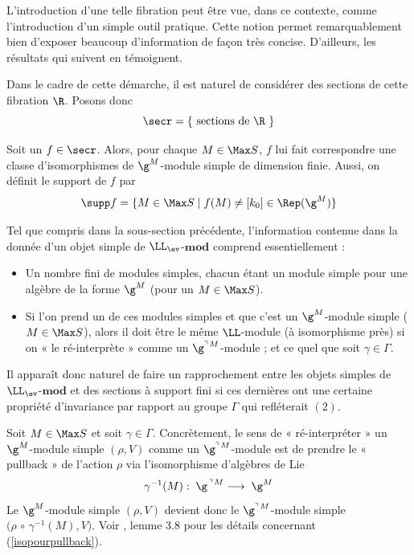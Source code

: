 \begin{Rem} L'introduction d'une telle fibration peut être vue, dans ce contexte, comme l'introduction d'un simple outil pratique. Cette notion permet remarquablement bien d'exposer beaucoup d'information de façon très concise. D'ailleurs, les résultats qui suivent en témoignent.
\end{Rem}

Dans le cadre de cette démarche, il est naturel de considérer des sections de cette fibration $\R$. Posons donc 
$$ \secr = \{ \text{ sections de } \R \text{ } \} $$

Soit un $f \in \secr$. Alors, pour chaque $M \in \Max S$, $f$ lui fait correspondre une classe d'isomorphismes de $\g^M$-module simple de dimension finie. Aussi, on définit le support de $f$ par
$$ \supp f  = \{M \in \Max S \; | \; f(M) \neq [k_0] \in \Rep(\g^M)\}$$

\begin{Rem} \label{supraremarque} Tel que compris dans la sous-section précédente, l'information contenue dans la donnée d'un objet simple de $\LL_{\ev}$-$\mathbf{mod}$ comprend essentiellement :
\begin{itemize}
\item[\em(1)] Un nombre fini de modules simples, chacun étant un module simple pour une algèbre de la forme $\g^M$ (pour un $M \in \Max S$).
\item[\em(2)] Si l'on prend un de ces modules simples et que c'est un $\g^M$-module simple ($M \in \Max S$), alors il doit être le même $\LL$-module (à isomorphisme près) si on « le ré-interprète » comme un $\g^{{}^\gamma M}$-module ; et ce quel que soit $\gamma \in \Gamma$.
\end{itemize}
Il apparaît donc naturel de faire un rapprochement entre les objets simples de $\LL_{\ev}$-$\mathbf{mod}$ et des sections à support fini si ces dernières ont une certaine propriété d'invariance par rapport au groupe $\Gamma$ qui refléterait $(2)$.
\end{Rem}

Soit $M \in \Max S$ et soit $\gamma \in \Gamma$. Concrètement, le sens de « ré-interpréter » un $\g^M$-module simple $(\rho,V)$ comme un $\g^{{}^\gamma M}$-module est de prendre le « pullback » de l'action $\rho$ via l'isomorphisme d'algèbres de Lie 
\begin{equation} \label{isopourpullback}
\gamma^{-1}(M) : \; \g^{\,{}^\gamma M} \longrightarrow \; \g^M
\end{equation}
Le $\g^M$-module simple $(\rho,V)$ devient donc le $\g^{{}^\gamma M}$-module simple $\big(\rho \,\circ\, \gamma^{-1}(M),V\big)$. Voir \cite{LauTCA}, lemme 3.8 pour les détails concernant (\ref{isopourpullback}). 

